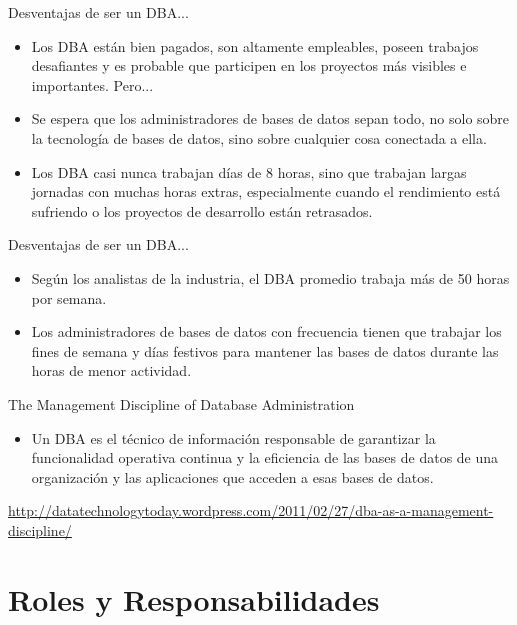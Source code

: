 \documentclass{beamer}
\newcommand{\toRight}[1]{
    \begin{FlushRight}
        {\tiny #1}
    \end{FlushRight}
} %
\begin{document}
\begin{frame}{Desventajas de ser un DBA...}
    \begin{itemize}
        \item Los DBA están bien pagados, son altamente empleables, poseen trabajos desafiantes y es probable que participen en los proyectos más visibles e importantes. Pero...
        \item Se espera que los administradores de bases de datos sepan todo, no solo sobre la tecnología de bases de datos, sino sobre cualquier cosa conectada a ella. 
        \item Los DBA casi nunca trabajan días de 8 horas, sino que trabajan largas jornadas con muchas horas extras, especialmente cuando el rendimiento está sufriendo o los proyectos de desarrollo están retrasados. 
    \end{itemize}
\end{frame}


\begin{frame}{Desventajas de ser un DBA...}
    \begin{itemize}
        \item Según los analistas de la industria, el DBA promedio trabaja más de 50 horas por semana.
        \item Los administradores de bases de datos con frecuencia tienen que trabajar los fines de semana y días festivos para mantener las bases de datos durante las horas de menor actividad.
    \end{itemize}
\end{frame}

\begin{frame}{The Management Discipline of Database Administration}
    \begin{itemize}
        \item Un DBA es el técnico de información responsable de garantizar la funcionalidad operativa continua y la eficiencia de las bases de datos de una organización y las aplicaciones que acceden a esas bases de datos.
    \end{itemize}
    
    \toRight{\url{http://datatechnologytoday.wordpress.com/2011/02/27/dba-as-a-management-discipline/}}
\end{frame}

\section{Roles y Responsabilidades}
\end{document}
